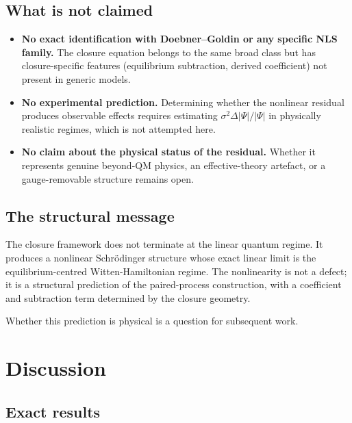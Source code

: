\documentclass[12pt]{article}
\begin{document}
\subsection*{What is not claimed}

\begin{itemize}
    \item \textbf{No exact identification with Doebner--Goldin or any specific NLS family.} The closure equation belongs to the same broad class but has closure-specific features (equilibrium subtraction, derived coefficient) not present in generic models.
    \item \textbf{No experimental prediction.} Determining whether the nonlinear residual produces observable effects requires estimating $\sigma^2\Delta|\Psi|/|\Psi|$ in physically realistic regimes, which is not attempted here.
    \item \textbf{No claim about the physical status of the residual.} Whether it represents genuine beyond-QM physics, an effective-theory artefact, or a gauge-removable structure remains open.
\end{itemize}

\subsection*{The structural message}

The closure framework does not terminate at the linear quantum regime. It produces a nonlinear Schr\"odinger structure whose exact linear limit is the equilibrium-centred Witten-Hamiltonian regime. The nonlinearity is not a defect; it is a structural prediction of the paired-process construction, with a coefficient and subtraction term determined by the closure geometry.

Whether this prediction is physical is a question for subsequent work.

\section{Discussion}\label{sec:discussion}

\subsection{Exact results}
\end{document}
